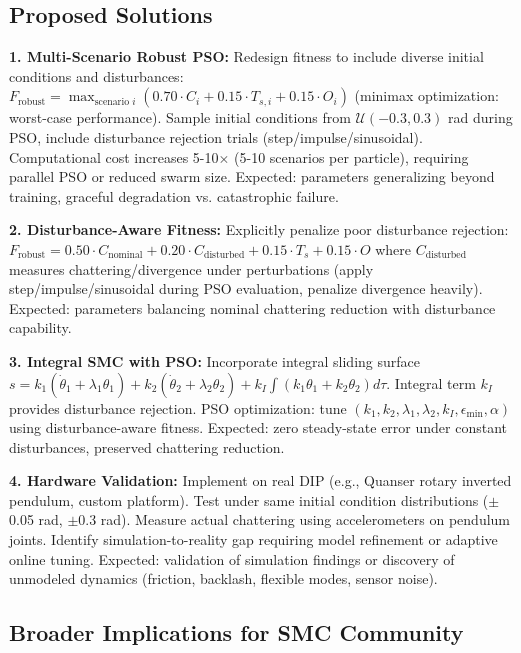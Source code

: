 \documentclass[conference]{IEEEtran}
\begin{document}
\subsection{Proposed Solutions}

\textbf{1. Multi-Scenario Robust PSO:} Redesign fitness to include diverse initial conditions and disturbances: $F_{\text{robust}} = \max_{\text{scenario } i} (0.70 \cdot C_i + 0.15 \cdot T_{s,i} + 0.15 \cdot O_i)$ (minimax optimization: worst-case performance). Sample initial conditions from $\mathcal{U}(-0.3, 0.3)$ rad during PSO, include disturbance rejection trials (step/impulse/sinusoidal). Computational cost increases 5-10$\times$ (5-10 scenarios per particle), requiring parallel PSO or reduced swarm size. Expected: parameters generalizing beyond training, graceful degradation vs. catastrophic failure.

\textbf{2. Disturbance-Aware Fitness:} Explicitly penalize poor disturbance rejection: $F_{\text{robust}} = 0.50 \cdot C_{\text{nominal}} + 0.20 \cdot C_{\text{disturbed}} + 0.15 \cdot T_s + 0.15 \cdot O$ where $C_{\text{disturbed}}$ measures chattering/divergence under perturbations (apply step/impulse/sinusoidal during PSO evaluation, penalize divergence heavily). Expected: parameters balancing nominal chattering reduction with disturbance capability.

\textbf{3. Integral SMC with PSO:} Incorporate integral sliding surface $s = k_1(\dot{\theta}_1 + \lambda_1\theta_1) + k_2(\dot{\theta}_2 + \lambda_2\theta_2) + k_I \int (k_1\theta_1 + k_2\theta_2) d\tau$. Integral term $k_I$ provides disturbance rejection. PSO optimization: tune $(k_1, k_2, \lambda_1, \lambda_2, k_I, \epsilon_{\min}, \alpha)$ using disturbance-aware fitness. Expected: zero steady-state error under constant disturbances, preserved chattering reduction.

\textbf{4. Hardware Validation:} Implement on real DIP (e.g., Quanser rotary inverted pendulum, custom platform). Test under same initial condition distributions ($\pm$0.05 rad, $\pm$0.3 rad). Measure actual chattering using accelerometers on pendulum joints. Identify simulation-to-reality gap requiring model refinement or adaptive online tuning. Expected: validation of simulation findings or discovery of unmodeled dynamics (friction, backlash, flexible modes, sensor noise).

\subsection{Broader Implications for SMC Community}
\end{document}
